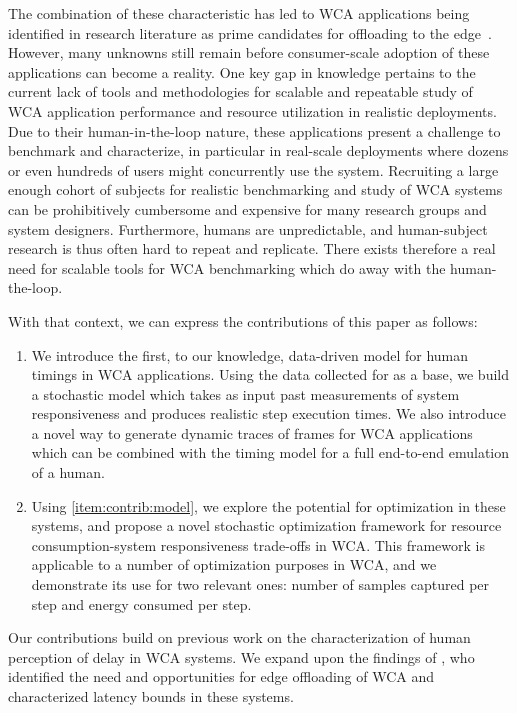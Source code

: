 The combination of these characteristic has led to \ac{WCA} applications being identified in research literature as prime candidates for offloading to the edge~\cite{Ha2014towards,Chen2017Empirical,Chen2018application}.
However, many unknowns still remain before consumer-scale adoption of these applications can become a reality.
One key gap in knowledge pertains to the current lack of tools and methodologies for scalable and repeatable study of \ac{WCA} application performance and resource utilization in realistic deployments.
Due to their human-in-the-loop nature, these applications present a challenge to benchmark and characterize, in particular in real-scale deployments where dozens or even hundreds of users might concurrently use the system.
Recruiting a large enough cohort of subjects for realistic benchmarking and study of \ac{WCA} systems can be prohibitively cumbersome and expensive for many research groups and system designers.
Furthermore, humans are unpredictable, and human-subject research is thus often hard to repeat and replicate.
There exists therefore a real need for scalable tools for \ac{WCA} benchmarking which do away with the human-the-loop.

\medskip

With that context, we can express the contributions of this paper as follows:
\begin{enumerate}
    \item\label{item:contrib:model} We introduce the first, to our knowledge, data-driven model for human timings in \ac{WCA} applications.
    Using the data collected for \textcite{olguinmunoz:impact2021} as a base, we build a stochastic model which takes as input past measurements of system responsiveness and produces realistic step execution times.
    We also introduce a novel way to generate dynamic traces of frames for \ac{WCA} applications which can be combined with the timing model for a full end-to-end emulation of a human.
    \item Using \cref{item:contrib:model}, we explore the potential for optimization in these systems, and propose a novel stochastic optimization framework for resource consumption-system responsiveness trade-offs in \ac{WCA}.
    This framework is applicable to a number of optimization purposes in \ac{WCA}, and we demonstrate its use for two relevant ones: number of samples captured per step and energy consumed per step.
\end{enumerate}

Our contributions build on previous work on the characterization of human perception of delay in \ac{WCA} systems.
We expand upon the findings of \textcite{Ha2014towards,Chen2017Empirical}, who identified the need and opportunities for edge offloading of \ac{WCA} and characterized latency bounds in these systems.

